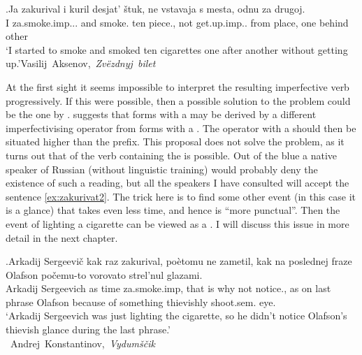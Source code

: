 \exg.\label{ex:zakurivat1}Ja zakurival i kuril desjat' \v{s}tuk, ne vstavaja s mesta, odnu za drugoj.\\
I za.smoke.imp... and smoke. ten piece., not get.up.imp.. from place, one behind other\\
\trans `I started to smoke and smoked ten cigarettes one after another without getting up.'\hbox{}\hfill\hbox{Vasilij Aksenov, \textit{Zv\"{e}zdnyj bilet}}

At the first sight it seems impossible to interpret the resulting imperfective verb progressively. If this were possible, then a possible solution to the problem could be the one by \citet{Ramchand:04}. \citeauthor{Ramchand:04} suggests that  forms with a  may be derived by a different imperfectivising operator from  forms with a . The operator with a  should then be situated higher than the  prefix. This proposal does not solve the problem, as it turns out that  of the  verb containing the   is possible. Out of the blue a native speaker of Russian (without linguistic training) would probably deny the existence of such a reading, but all the speakers I have consulted will accept the sentence \ref{ex:zakurivat2}. The trick here is to find some other event (in this case it is a glance) that takes even less time, and hence is ``more punctual''. Then the event of lighting a cigarette can be viewed as a . I will discuss this issue in more detail in the next chapter.

\exg.\label{ex:zakurivat2}Arkadij Sergeevi\v{c} kak raz zakurival, po\`{e}tomu ne zametil, kak na poslednej fraze Olafson po\v{c}emu-to vorovato strel'nul glazami.\\
Arkadij Sergeevich as time za.smoke.imp, {that is why} not notice., as on last phrase Olafson {because of something} thievishly shoot.sem. eye.\\
\trans `Arkadij Sergeevich was just lighting the cigarette, so he didn't notice Olafson's thievish glance during the last phrase.'\\\hbox{}\hfill\hbox{
Andrej Konstantinov, \textit{Vydum\v{s}\v{c}ik}}

